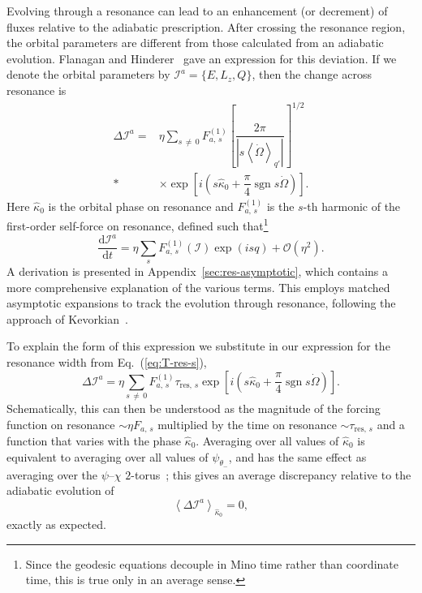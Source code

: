 \documentclass[aps,prd,amsfonts,amssymb,amsmath,nofootinbib,showpacs,superscriptaddress,twocolumn,floatfix]{revtex4-1}
\newcommand{\eqnref}[1]{Eq.~(\ref{eq:#1})}
\newcommand{\apref}[1]{Appendix~\ref{sec:#1}}
\newcommand{\dd}{\ensuremath{\mathrm{d}}}
\newcommand{\diff}[2]{\ensuremath{\dfrac{\dd {#1}}{\dd {#2}}}}
\newcommand{\order}[1]{\ensuremath{\mathcal{O}({#1})}}
\DeclareMathOperator{\sgn}{sgn}
\begin{document}
Evolving through a resonance can lead to an enhancement (or decrement) of fluxes relative to the adiabatic prescription. After crossing the resonance region, the orbital parameters are different from those calculated from an adiabatic evolution. Flanagan and Hinderer~\cite{Flanagan2012} gave an expression for this deviation. If we denote the orbital parameters by $\mathcal{I}^a = \{E,L_z,Q\}$, then the change across resonance is
\begin{align}
\Delta \mathcal{I}^a = {} & \eta\sum_{s\,\neq\,0}F_{a,\,s}^{(1)}\left[\dfrac{2\pi}{\left|s \left\langle\dot{\Omega}\right\rangle_{q'}\right|}\right]^{1/2} \nonumber \\*
 {} & \times {} \exp\left[i\left(s \widehat{\kappa}_0 + \dfrac{\pi}{4} \sgn s\dot{\Omega}\right)\right]. 
\end{align}
Here $\widehat{\kappa}_0$ is the orbital phase on resonance and $F_{a,\,s}^{(1)}$ is the $s$-th harmonic of the first-order self-force on resonance, defined such that\footnote{Since the geodesic equations decouple in Mino time rather than coordinate time, this is true only in an average sense.}
\begin{equation}
\diff{\mathcal{I}^a}{t} = \eta\sum_s F_{a,\,s}^{(1)}(\boldsymbol{\mathcal{I}})\exp(is q) + \order{\eta^2}.
\end{equation}
A derivation is presented in \apref{res-asymptotic}, which contains a more comprehensive explanation of the various terms. This employs matched asymptotic expansions to track the evolution through resonance, following the approach of Kevorkian~\cite{Kevorkian1987}.

To explain the form of this expression we substitute in our expression for the resonance width from \eqnref{T-res-s},
\begin{equation}
\label{eq:delta-I-a}
\Delta \mathcal{I}^a = \eta\sum_{s\,\neq\,0}F_{a,\,s}^{(1)}\tau_{\mathrm{res},\,s}\exp\left[i\left(s \widehat{\kappa}_0 + \dfrac{\pi}{4} \sgn s\dot{\Omega}\right)\right]. 
\end{equation}
Schematically, this can then be understood as the magnitude of the forcing function on resonance $\sim \eta F_{a,\,s}$ multiplied by the time on resonance $\sim \tau_{\mathrm{res},\,s}$ and a function that varies with the phase $\widehat{\kappa}_0$. Averaging over all values of $\widehat{\kappa}_0$ is equivalent to averaging over all values of $\psi_{\theta_-}$, and has the same effect as averaging over the $\psi$--$\chi$ $2$-torus~\cite{Grossman2011}; this gives an average discrepancy relative to the adiabatic evolution of
\begin{equation}
\left\langle \Delta \mathcal{I}^a \right\rangle_{\hat{\kappa}_0} = 0,
\end{equation}
exactly as expected.
\end{document}
